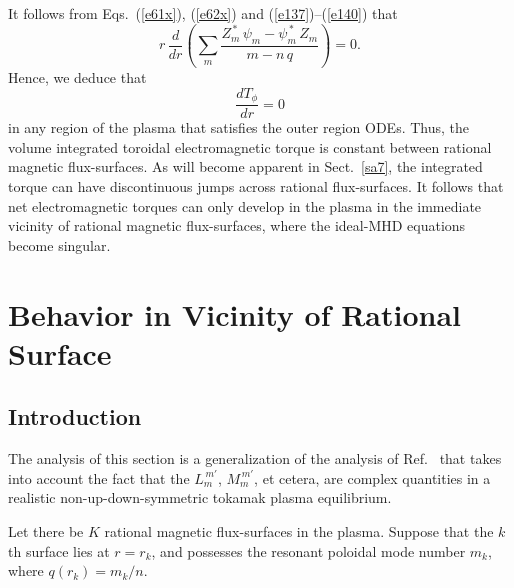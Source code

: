 \documentclass[12pt,prb,aps]{revtex4-1}
\begin{document}
 It follows from Eqs.~(\ref{e61x}), (\ref{e62x}) and (\ref{e137})--(\ref{e140}) that
\begin{equation}\label{e141c}
r\,\frac{d}{dr}\!\left(\sum_{m} \frac{Z_m^{\,\ast}\,\psi_m-\psi_m^{\,\ast}\,Z_m}{m-n\,q}\right)= 0.
\end{equation}
Hence, we deduce that\,\cite{am1}
\begin{equation}\label{etcons}
\frac{dT_\phi}{dr}=0
\end{equation}
in any region of the plasma that satisfies the outer region ODEs. Thus, the volume integrated toroidal electromagnetic torque is
constant between rational magnetic flux-surfaces. As will become apparent in Sect.~\ref{sa7}, the integrated torque can have discontinuous jumps across rational flux-surfaces. It follows that
net electromagnetic torques can only develop in the plasma in the immediate vicinity of rational magnetic flux-surfaces, where the ideal-MHD equations  become singular. \cite{rfa}

\section{Behavior in Vicinity of Rational Surface}\label{snus}
\subsection{Introduction}
The analysis of this section is a generalization of the analysis of Ref.~ that takes into
account the fact that the $L_m^{\,m'}$, $M_m^{\,m'}$, et cetera, are complex quantities in a realistic non-up-down-symmetric tokamak
plasma equilibrium.

Let there be $K$ rational magnetic flux-surfaces in the plasma. Suppose that the $k$th surface lies at $r=r_k$, and possesses the resonant
poloidal mode number $m_k$, where $q(r_k)=m_k/n$.   
\end{document}
